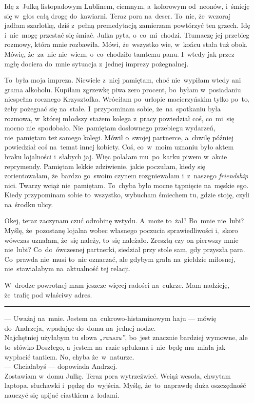 \documentclass[9pt, a5paper]{memoir}
\begin{document}
Idę z~Julką listopadowym Lublinem, ciemnym, a~kolorowym od~neonów, i~śmieję się w~głos całą drogę do~kawiarni. Teraz pora na~deser. To~nic, że~wczoraj jadłam szarlotkę, dziś z~pełną premedytacją zamierzam powtórzyć ten grzech. Idę i~nie~mogę przestać się śmiać. Julka pyta, o~co~mi~chodzi. Tłumaczę jej przebieg rozmowy, która mnie rozbawiła. Mówi, że~wszystko wie, w~końcu stała tuż obok. Mówię, że~za~nic nie~wiem, o~co~chodziło tamtemu panu. I~wtedy jak przez mgłę dociera do~mnie sytuacja z~jednej imprezy pożegnalnej.

To~była moja impreza. Niewiele z~niej pamiętam, choć nie~wypiłam wtedy ani grama alkoholu. Kupiłam zgrzewkę piwa zero procent, bo~byłam w~posiadaniu niespełna rocznego Krzysztofka. Wróciłam po~urlopie macierzyńskim tylko po~to, żeby pożegnać się na~stałe. I~przypominam sobie, że~na~spotkaniu była rozmowa, w~której młodszy stażem kolega z~pracy powiedział coś, co~mi~się mocno nie~spodobało. Nie~pamiętam dosłownego przebiegu wydarzeń, nie~pamiętam też samego kolegi. Mówił o~swojej partnerce, a~chwilę później powiedział coś na~temat innej kobiety. Coś, co~w~moim uznaniu było aktem braku lojalności i~słabych jaj. Więc polałam mu~po~karku piwem w~akcie reprymendy. Pamiętam lekkie zdziwienie, jakie poczułam, kiedy się zorientowałam, że~bardzo go~swoim czynem rozgniewałam i~z~naszego \textit{friendship} nici. Twarzy wciąż nie~pamiętam. To~chyba było mocne tąpnięcie na~męskie ego. Kiedy przypominam sobie to~wszystko, wybucham śmiechem tu, gdzie stoję, czyli na~środku ulicy.

Okej, teraz zaczynam czuć odrobinę wstydu. A~może to~żal? Bo~mnie nie~lubi? Myślę, że~pozostanę lojalna wobec własnego poczucia sprawiedliwości i,~skoro wówczas uznałam, że~się należy, to~się należało. Zresztą czy on pierwszy mnie nie~lubi? Co~do~ówczesnej partnerki, siedział przy stole sam, gdy przyszła para. Co~prawda nie~musi to~nic oznaczać, ale gdybym grała na~giełdzie miłosnej, nie~stawiałabym na~aktualność tej relacji.

W~drodze powrotnej mam jeszcze więcej radości na~cukrze. Mam nadzieję, że~trafię pod właściwy adres.

\fancybreak{* \quad * \quad *}

--- Uważaj na~mnie. Jestem na~cukrowo-histaminowym haju --- mówię do~Andrzeja, wpadając do~domu na~jednej nodze.\\
Najchętniej użyłabym tu słowa \textit{„rauszu”}, bo~jest znacznie bardziej wymowne, ale to~słówko Doszłego, a~jestem na~razie spłukana i~nie~będę mu~miała jak wypłacić tantiem. No, chyba że~w~naturze.\\
--- Chciałabyś --- dopowiada Andrzej.\\
Zostawiam w~domu Julkę. Teraz pora wytrzeźwieć. Wciąż wesoła, chwytam laptopa, słuchawki i~pędzę do~wyjścia. Myślę, że~to~naprawdę duża oszczędność nauczyć się upijać ciastkiem z~lodami.
\end{document}
